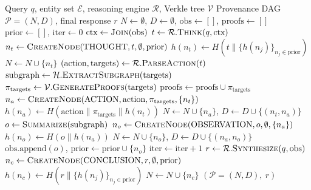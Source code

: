 \documentclass[11pt,a4paper]{article}
\begin{document}
\begin{algorithm}[H]
\caption{Provenance DAG Construction during Agentic Reasoning}
\label{alg:provenance_dag}
\begin{algorithmic}[1]
\REQUIRE Query $q$, entity set $\mathcal{E}$, reasoning engine $\mathcal{R}$, Verkle tree $\mathcal{V}$
\ENSURE Provenance DAG $\mathcal{P} = (N, D)$, final response $r$
\STATE $N \leftarrow \emptyset$, $D \leftarrow \emptyset$, $\text{obs} \leftarrow []$, $\text{proofs} \leftarrow []$
\STATE $\text{prior} \leftarrow []$, $\text{iter} \leftarrow 0$
    \STATE $\text{ctx} \leftarrow \textsc{Join}(\text{obs})$
    \STATE {}
    \STATE $t \leftarrow \mathcal{R}.\textsc{Think}(q, \text{ctx})$
    \STATE $n_t \leftarrow \textsc{CreateNode}(\text{THOUGHT}, t, \emptyset, \text{prior})$
    \STATE $h(n_t) \leftarrow H(t \| \{h(n_j)\}_{n_j \in \text{prior}})$
    \STATE $N \leftarrow N \cup \{n_t\}$
    \STATE {}
    \STATE $(\text{action}, \text{targets}) \leftarrow \mathcal{R}.\textsc{ParseAction}(t)$
    \STATE $\text{subgraph} \leftarrow \mathcal{H}.\textsc{ExtractSubgraph}(\text{targets})$
    \STATE $\pi_{\text{targets}} \leftarrow \mathcal{V}.\textsc{GenerateProofs}(\text{targets})$
    \STATE $\text{proofs} \leftarrow \text{proofs} \cup \pi_{\text{targets}}$
    \STATE $n_a \leftarrow \textsc{CreateNode}(\text{ACTION}, \text{action}, \pi_{\text{targets}}, \{n_t\})$
    \STATE $h(n_a) \leftarrow H(\text{action} \| \pi_{\text{targets}} \| h(n_t))$
    \STATE $N \leftarrow N \cup \{n_a\}$, $D \leftarrow D \cup \{(n_t, n_a)\}$
    \STATE {}
    \STATE $o \leftarrow \textsc{Summarize}(\text{subgraph})$
    \STATE $n_o \leftarrow \textsc{CreateNode}(\text{OBSERVATION}, o, \emptyset, \{n_a\})$
    \STATE $h(n_o) \leftarrow H(o \| h(n_a))$
    \STATE $N \leftarrow N \cup \{n_o\}$, $D \leftarrow D \cup \{(n_a, n_o)\}$
    \STATE $\text{obs}.\text{append}(o)$, $\text{prior} \leftarrow \text{prior} \cup \{n_o\}$
    \STATE $\text{iter} \leftarrow \text{iter} + 1$
\ENDWHILE
\STATE {}
\STATE $r \leftarrow \mathcal{R}.\textsc{Synthesize}(q, \text{obs})$
\STATE $n_c \leftarrow \textsc{CreateNode}(\text{CONCLUSION}, r, \emptyset, \text{prior})$
\STATE $h(n_c) \leftarrow H(r \| \{h(n_j)\}_{n_j \in \text{prior}})$
\STATE $N \leftarrow N \cup \{n_c\}$
\RETURN $(\mathcal{P} = (N, D),\ r)$
\end{algorithmic}
\end{algorithm}
\end{document}
